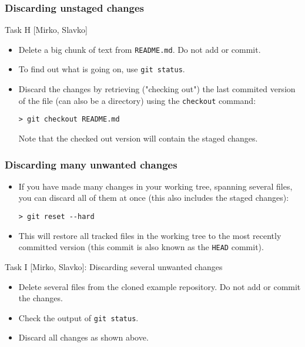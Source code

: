 \begin{frame}[fragile]
	\frametitle{Discarding unstaged changes}
	
	\begin{block}{Task H [Mirko, Slavko]}
	\begin{itemize}
	\item Delete a big chunk of text from \texttt{README.md}. Do not add or commit.
	
	\item To find out what is going on, use \texttt{git status}.
	\medskip	
    \item Discard the changes by retrieving ("checking out") the last commited version of the file (can also be a directory) using the \texttt{checkout} command:

	\begin{verbatim}
> git checkout README.md
	\end{verbatim}
	
	Note that the checked out version will contain the staged changes.
	\end{itemize}	
	\end{block}
\end{frame}
\begin{frame}[fragile]

\frametitle{Discarding many unwanted changes}

	\begin{itemize}
	\item If you have made many changes in your working tree, spanning several files, you can discard all of them at once (this also includes the staged changes): 
	\begin{verbatim}
> git reset --hard
	\end{verbatim}
 
	\item This will restore all tracked files in the working tree to the most recently committed version (this commit is also known as the \texttt{HEAD} commit).
	\end{itemize}

\begin{block}{Task I [Mirko, Slavko]: Discarding several unwanted changes}
	\begin{itemize}
	\item Delete several files from the cloned example repository. Do not add or commit the changes.
	\item Check the output of \texttt{git status}.
	\item Discard all changes as shown above.
	\end{itemize}
\end{block}

\end{frame}

